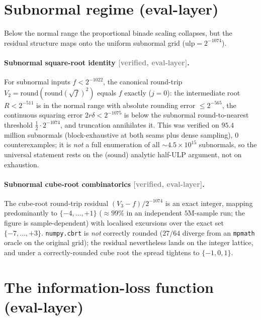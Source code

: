 \documentclass[11pt,a4paper]{article}
\newcommand{\status}[1]{\textcolor{gray}{\small\textsf{[#1]}}}
\begin{document}
\section{Subnormal regime (eval-layer)}\label{sec:subnormal}

Below the normal range the proportional binade scaling collapses, but the residual structure maps onto the uniform subnormal grid ($\mathrm{ulp}=2^{-1074}$).

\paragraph{Subnormal square-root identity \status{verified, eval-layer}.} For subnormal inputs $f<2^{-1022}$, the canonical round-trip $V_2=\mathrm{round}(\mathrm{round}(\sqrt f)^2)$ equals $f$ exactly ($j=0$): the intermediate root $R<2^{-511}$ is in the normal range with absolute rounding error $\le2^{-565}$, the continuous squaring error $2r\delta<2^{-1075}$ is below the subnormal round-to-nearest threshold $\tfrac12\cdot2^{-1074}$, and truncation annihilates it. This was verified on $95.4$ million subnormals (block-exhaustive at both seams plus dense sampling), $0$ counterexamples; it is \emph{not} a full enumeration of all $\sim4.5\times10^{15}$ subnormals, so the universal statement rests on the (sound) analytic half-ULP argument, not on exhaustion.

\paragraph{Subnormal cube-root combinatorics \status{verified, eval-layer}.} The cube-root round-trip residual $(V_3-f)/2^{-1074}$ is an exact integer, mapping predominantly to $\{-4,\dots,+1\}$ ($\approx99\%$ in an independent $5$M-sample run; the figure is sample-dependent) with localised excursions over the exact set $\{-7,\dots,+3\}$. \texttt{numpy.cbrt} is \emph{not} correctly rounded ($27/64$ diverge from an \texttt{mpmath} oracle on the original grid); the residual nevertheless lands on the integer lattice, and under a correctly-rounded cube root the spread tightens to $\{-1,0,1\}$.

\section{The information-loss function (eval-layer)}\label{sec:wk}
\end{document}
